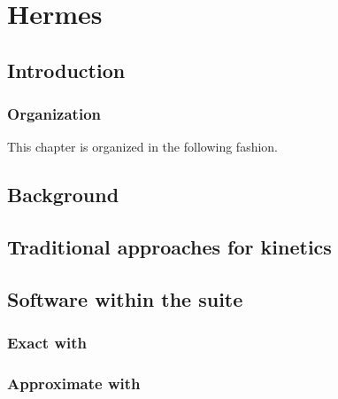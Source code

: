 
\chapter{Hermes}
\label{ch:hermes}


\section{Introduction}
\label{sec:hermes:intro}

\subsection{Organization}
\label{subsec:hermes:org}

This chapter is organized in the following fashion.

\section{Background}
\label{sec:hermes:bkgrnd}

\section{Traditional approaches for kinetics}
\label{sec:hermes:kinetics}

\subsection{\Mfpt}
\label{subsec:hermes:mfpt}

\subsection{\Eqt}
\label{subsec:hermes:eq}

\section{Software within the \hermes suite}
\label{sec:hermes:layout}

\subsection{Exact \eqt with \rnaeq}
\label{subsec:hermes:rnaeq}

\subsection{Approximate \eqt with \ffteq}
\label{subsec:hermes:ffteq}

